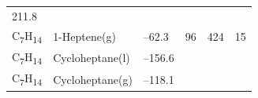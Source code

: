 \documentclass[
  9pt,
]{extbook}
\theoremstyle{definition}
\theoremstyle{definition}
\theoremstyle{definition}
\theoremstyle{remark}
\begin{document}
\begin{longtable}[]{@{}llllll@{}}
\begin{minipage}[t]{0.14\columnwidth}
211.8\strut
\end{minipage}\tabularnewline
\begin{minipage}[t]{0.07\columnwidth}\raggedright
C\textsubscript{7}H\textsubscript{14}\strut
\end{minipage} & \begin{minipage}[t]{0.17\columnwidth}\raggedright
1-Heptene(g)\strut
\end{minipage} & \begin{minipage}[t]{0.15\columnwidth}\raggedright
--62.3\strut
\end{minipage} & \begin{minipage}[t]{0.15\columnwidth}\raggedright
96\strut
\end{minipage} & \begin{minipage}[t]{0.14\columnwidth}\raggedright
424\strut
\end{minipage} & \begin{minipage}[t]{0.14\columnwidth}\raggedright
15\strut
\end{minipage}\tabularnewline
\begin{minipage}[t]{0.07\columnwidth}\raggedright
C\textsubscript{7}H\textsubscript{14}\strut
\end{minipage} & \begin{minipage}[t]{0.17\columnwidth}\raggedright
Cycloheptane(l)\strut
\end{minipage} & \begin{minipage}[t]{0.15\columnwidth}\raggedright
--156.6\strut
\end{minipage} & \begin{minipage}[t]{0.15\columnwidth}\raggedright
\strut
\end{minipage} & \begin{minipage}[t]{0.14\columnwidth}\raggedright
\strut
\end{minipage} & \begin{minipage}[t]{0.14\columnwidth}\raggedright
\strut
\end{minipage}\tabularnewline
\begin{minipage}[t]{0.07\columnwidth}\raggedright
C\textsubscript{7}H\textsubscript{14}\strut
\end{minipage} & \begin{minipage}[t]{0.17\columnwidth}\raggedright
Cycloheptane(g)\strut
\end{minipage} & \begin{minipage}[t]{0.15\columnwidth}\raggedright
--118.1\strut
\end{minipage} & \begin{minipage}[t]{0.15\columnwidth}\raggedright

\end{minipage}
\end{longtable}
\end{document}
